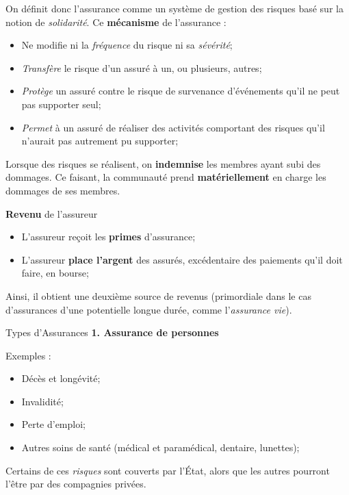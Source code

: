 \documentclass[10pt, french]{article}
\begin{document}
\begin{multicols*}{3}
\begin{definitionNOHFILL}[L'assurance]
On définit donc l'assurance comme un système de gestion des risques basé sur la notion de \textit{solidarité}. Ce \textbf{mécanisme} de l'assurance :
\begin{itemize}
	\item	Ne modifie ni la \textit{fréquence} du risque ni sa \textit{sévérité};
	\item	\textit{Transfère} le risque d'un assuré à un, ou plusieurs, autres;
	\item	\textit{Protège} un assuré contre le risque de survenance d'événements qu'il ne peut pas supporter seul;
	\item	\textit{Permet} à un assuré de réaliser des activités comportant des risques qu'il n'aurait pas autrement pu supporter;
\end{itemize}

Lorsque des risques se réalisent, on \textbf{indemnise} les membres ayant subi des dommages. Ce faisant, la communauté prend \textbf{matériellement} en charge les dommages de ses membres.

\end{definitionNOHFILL}

\begin{algo}{\textbf{Revenu} de l'assureur}
\begin{itemize}
	\item	L'assureur reçoit les \textbf{primes} d'assurance;
	\item	L'assureur \textbf{place l'argent} des assurés, excédentaire des paiements qu'il doit faire, en bourse;
\end{itemize}
Ainsi, il obtient une deuxième source de revenus (primordiale dans le cas d'assurances d'une potentielle longue durée, comme l'\textit{assurance vie}).
\end{algo}


\begin{conceptgen}{Types d'Assurances}
\textbf{1. Assurance de personnes}  

Exemples : 
\begin{itemize}[leftmargin = *]
	\item	Décès et longévité;
	\item	Invalidité;
	\item	Perte d'emploi;
	\item	Autres soins de santé (médical et paramédical, dentaire, lunettes);
\end{itemize}  

Certains de ces \textit{risques} sont couverts par l'État, alors que les autres pourront l'être par des compagnies privées.   


\end{conceptgen}
\end{multicols*}
\end{document}
